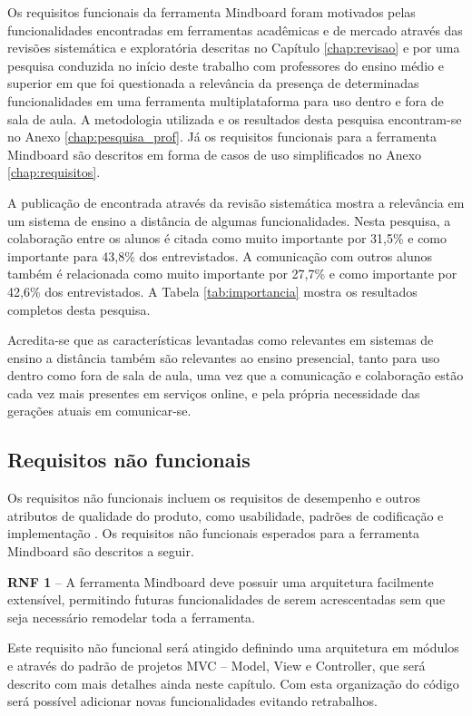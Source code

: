 Os requisitos funcionais da ferramenta Mindboard foram motivados pelas funcionalidades encontradas em ferramentas acadêmicas e de mercado através das revisões sistemática e exploratória descritas no Capítulo \ref{chap:revisao} e por uma pesquisa conduzida no início deste trabalho com professores do ensino médio e superior em que foi questionada a relevância da presença de determinadas funcionalidades em uma ferramenta multiplataforma para uso dentro e fora de sala de aula. A metodologia utilizada e os resultados desta pesquisa encontram-se no Anexo \ref{chap:pesquisa_prof}. Já os requisitos funcionais para a ferramenta Mindboard são descritos em forma de casos de uso simplificados no Anexo \ref{chap:requisitos}.

A publicação de   encontrada através da revisão sistemática mostra a relevância em um sistema de ensino a distância de algumas funcionalidades. Nesta pesquisa, a colaboração entre os alunos é citada como muito importante por 31,5\% e como importante para 43,8\% dos entrevistados. A comunicação com outros alunos também é relacionada como muito importante por 27,7\% e como importante por 42,6\% dos entrevistados. A Tabela \ref{tab:importancia} mostra os resultados completos desta pesquisa. 

Acredita-se que as características levantadas como relevantes em sistemas de ensino a distância também são relevantes ao ensino presencial, tanto para uso dentro como fora de sala de aula, uma vez que a comunicação e colaboração estão cada vez mais presentes em serviços online, e pela própria necessidade das gerações atuais em comunicar-se.


\subsection{Requisitos não funcionais}

Os requisitos não funcionais incluem os requisitos de desempenho e outros atributos de qualidade do produto, como usabilidade, padrões de codificação e implementação \cite{padua}. Os requisitos não funcionais esperados para a ferramenta Mindboard são descritos a seguir.

\textbf{RNF 1} – A ferramenta Mindboard deve possuir uma arquitetura facilmente extensível, permitindo futuras funcionalidades de serem acrescentadas sem que seja necessário remodelar toda a ferramenta.

Este requisito não funcional será atingido definindo uma arquitetura em módulos e através do padrão de projetos MVC – Model, View e Controller, que será descrito com mais detalhes ainda neste capítulo. Com esta organização do código será possível adicionar novas funcionalidades evitando retrabalhos.


